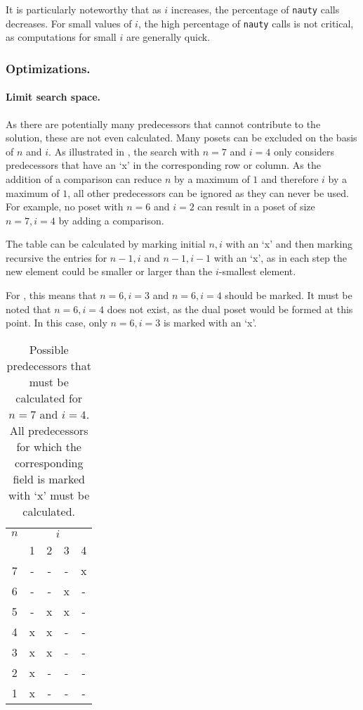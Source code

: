 \documentclass[twoside,leqno,twocolumn]{article}
\begin{document}
It is particularly noteworthy that as $i$ increases, the percentage of \texttt{nauty} calls decreases.
For small values of $i$, the high percentage of \texttt{nauty} calls is not critical, as computations for small $i$ are generally quick.

\subsubsection{Optimizations.}

\paragraph{Limit search space.}
As there are potentially many predecessors that cannot contribute to the solution, these are not even calculated.
Many posets can be excluded on the basis of $n$ and $i$.
As illustrated in , the search with $n = 7$ and $i = 4$ only considers predecessors that have an `x' in the corresponding row or column.
As the addition of a comparison can reduce $n$ by a maximum of $1$ and therefore $i$ by a maximum of $1$, all other predecessors can be ignored as they can never be used.
For example, no poset with $n = 6$ and $i = 2$ can result in a poset of size $n = 7, i = 4$ by adding a comparison.

The table can be calculated by marking initial $n, i$ with an `x' and then marking recursive the entries for $n - 1, i$ and $n - 1, i - 1$ with an `x', as in each step the new element could be smaller or larger than the $i$-smallest element.

For , this means that $n = 6, i = 3$ and $n = 6, i = 4$ should be marked.
It must be noted that $n = 6, i = 4$ does not exist, as the dual poset would be formed at this point.
In this case, only $n = 6, i = 3$ is marked with an `x'.

\begin{table}[!t]
  \renewcommand{\arraystretch}{1.1}
  \caption{Possible predecessors that must be calculated for $n = 7$ and $i = 4$. All predecessors for which the corresponding field is marked with `x' must be calculated.}
  \label{table:n_i_values_calculated}
  \centering
  \small
  \begin{tabular}{c|cccc}
    $n$ & \multicolumn{4}{c}{$i$}             \\
        & 1                       & 2 & 3 & 4 \\ \hline
    7   & -                       & - & - & x \\
    6   & -                       & - & x & - \\
    5   & -                       & x & x & - \\
    4   & x                       & x & - & - \\
    3   & x                       & x & - & - \\
    2   & x                       & - & - & - \\
    1   & x                       & - & - & - \\
  \end{tabular}%
\end{table}
\end{document}
